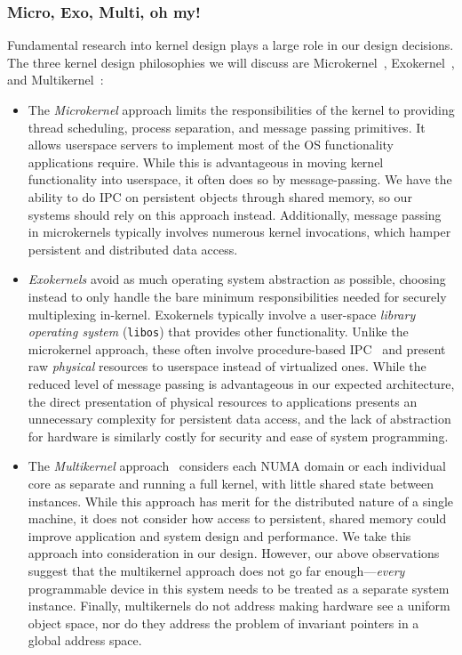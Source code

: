 \subsubsection{Micro, Exo, Multi, oh my!}

Fundamental research into kernel design plays a large role in our design decisions. The three kernel
design philosophies we will discuss are Microkernel~\cite{accetta:usenix86s},
Exokernel~\cite{engler:sosp95}, and Multikernel~\cite{baumann:sosp09}:
\begin{itemize}
    \item The \emph{Microkernel} approach limits the responsibilities of the kernel to providing
          thread scheduling, process separation, and message passing primitives. It allows userspace
          servers to implement most of the OS functionality applications require. While this is
          advantageous in moving kernel functionality into userspace, it often does so by
          message-passing. We have the ability to do IPC on persistent objects through
          shared memory, so our systems should rely on this approach instead. Additionally, message
          passing in microkernels typically involves numerous kernel invocations, which hamper
          persistent and distributed data access.

    \item \emph{Exokernels} avoid as much operating system abstraction as possible, choosing instead
          to only handle the bare minimum responsibilities needed for securely multiplexing in-kernel.
          Exokernels typically involve a user-space \textit{library operating system} (\texttt{libos}) that
          provides other functionality. Unlike the microkernel approach, these often involve
          procedure-based IPC~\cite{lauer:osr79,engler:sosp95} and present raw \emph{physical}
          resources to userspace instead of virtualized ones. While the reduced level of message
          passing is advantageous in our expected architecture, the direct presentation of physical resources
          to applications presents an unnecessary complexity for persistent data access, and the lack
          of abstraction for hardware is similarly costly for security and ease of system programming.

    \item The \emph{Multikernel} approach~\cite{baumann:sosp09} considers each NUMA domain or each individual core as
          separate and running a full kernel, with little shared state between instances. While
          this approach has merit for the distributed nature of a single machine, it does not consider
          how access to persistent, shared memory could improve application and system design
          and performance. We take this approach into consideration in our design.
          However, our above observations suggest that the multikernel approach does not go far
          enough---\emph{every} programmable device in this system needs to be treated as a separate
          system instance. Finally, multikernels do not address making hardware see a uniform
          object space, nor do they address the problem of invariant pointers in a global address space.
\end{itemize}

